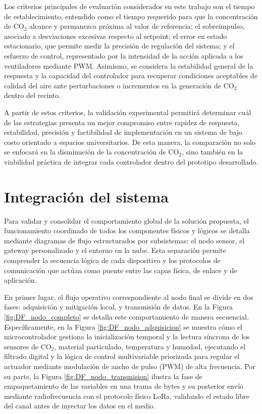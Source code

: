 Los criterios principales de evaluación considerados en este trabajo son el tiempo de establecimiento, entendido como el tiempo requerido para que la concentración de CO$_2$ alcance y permanezca próxima al valor de referencia; el sobreimpulso, asociado a desviaciones excesivas respecto al setpoint; el error en estado estacionario, que permite medir la precisión de regulación del sistema; y el esfuerzo de control, representado por la intensidad de la acción aplicada a los ventiladores mediante PWM. Asimismo, se considera la estabilidad general de la respuesta y la capacidad del controlador para recuperar condiciones aceptables de calidad del aire ante perturbaciones o incrementos en la generación de CO$_2$ dentro del recinto.

A partir de estos criterios, la validación experimental permitirá determinar cuál de las estrategias presenta un mejor compromiso entre rapidez de respuesta, estabilidad, precisión y factibilidad de implementación en un sistema de bajo costo orientado a espacios universitarios. De esta manera, la comparación no solo se enfocará en la disminución de la concentración de CO$_2$, sino también en la viabilidad práctica de integrar cada controlador dentro del prototipo desarrollado.







\newpage
\section{Integración del sistema}

Para validar y consolidar el comportamiento global de la solución propuesta, el funcionamiento coordinado de todos los componentes físicos y lógicos se detalla mediante diagramas de flujo estructurados por subsistemas: el nodo sensor, el gateway personalizado y el entorno en la nube. Esta separación permite comprender la secuencia lógica de cada dispositivo y los protocolos de comunicación que actúan como puente entre las capas física, de enlace y de aplicación.

En primer lugar, el flujo operativo correspondiente al nodo final se divide en dos fases: adquisición y mitigación local, y transmisión de datos. En la Figura \ref{fig:DF_nodo_completo} se detalla este comportamiento de manera secuencial. Específicamente, en la Figura \ref{fig:DF_nodo_adquisicion} se muestra cómo el microcontrolador gestiona la inicialización temporal y la lectura síncrona de los sensores de CO$_2$, material particulado, temperatura y humedad, ejecutando el filtrado digital y la lógica de control multivariable priorizada para regular el actuador mediante modulación de ancho de pulso (PWM) de alta frecuencia. Por su parte, la Figura \ref{fig:DF_nodo_transmision} ilustra la fase de empaquetamiento de las variables en una trama de bytes y su posterior envío mediante radiofrecuencia con el protocolo físico LoRa, validando el estado libre del canal antes de inyectar los datos en el medio.

